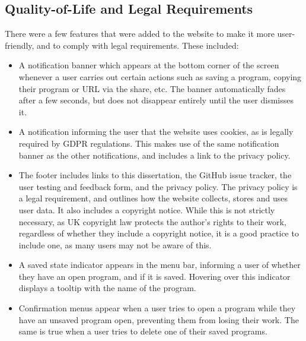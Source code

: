 \documentclass[../main.tex]{subfiles}
\begin{document}
        \subsection{Quality-of-Life and Legal Requirements}
            There were a few features that were added to the website to make it more
                user-friendly, and to comply with legal requirements.
            These included:
            \begin{itemize}
                \item A notification banner which appears at the bottom corner of the screen
                      whenever a user carries out certain actions such as saving a program, copying
                      their program or URL via the share, etc.
                      The banner automatically fades after a few seconds, but does not disappear
                          entirely until the user dismisses it.
                \item A notification informing the user that the website uses cookies, as is legally
                      required by GDPR regulations.
                      This makes use of the same notification banner as the other notifications, and
                          includes a link to the privacy policy.
                \item The footer includes links to this dissertation, the GitHub issue tracker,
                      the user testing and feedback form, and the privacy policy.
                      The privacy policy is a legal requirement, and outlines how the website
                          collects, stores and uses user data.
                      It also includes a copyright notice.
                      While this is not strictly necessary, as UK copyright law protects the author's
                          rights to their work, regardless of whether they include a copyright notice, it
                          is a good practice to include one, as many users may not be aware of this.
                \item A saved state indicator appears in the menu bar, informing a user of whether
                      they have an open program, and if it is saved.
                      Hovering over this indicator displays a tooltip with the name of the program.
                \item Confirmation menus appear when a user tries to open a program while they
                      have an unsaved program open, preventing them from losing their work.
                      The same is true when a user tries to delete one of their saved programs.
            \end{itemize}
\end{document}
